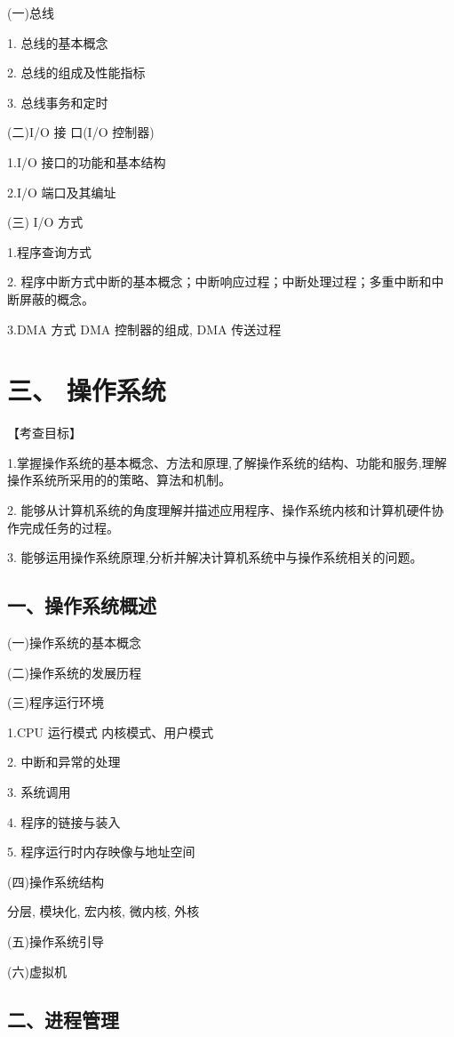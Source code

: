 \documentclass[10pt]{article}
\begin{document}
(一)总线

1. 总线的基本概念 

2. 总线的组成及性能指标 

3. 总线事务和定时 

(二)I/O 接 口(I/O 控制器) 

1.I/O 接口的功能和基本结构 

2.I/O 端口及其编址 

(三) I/O 方式 

1.程序查询方式 

2. 程序中断方式中断的基本概念；中断响应过程；中断处理过程；多重中断和中断屏蔽的概念。 

3.DMA 方式 DMA 控制器的组成, DMA 传送过程

\section*{三、 操作系统}

【考查目标】

1.掌握操作系统的基本概念、方法和原理,了解操作系统的结构、功能和服务,理解操作系统所采用的的策略、算法和机制。

2. 能够从计算机系统的角度理解并描述应用程序、操作系统内核和计算机硬件协作完成任务的过程。

3. 能够运用操作系统原理,分析并解决计算机系统中与操作系统相关的问题。

\subsection*{一、操作系统概述}

(一)操作系统的基本概念

(二)操作系统的发展历程

(三)程序运行环境

1.CPU 运行模式 内核模式、用户模式

2. 中断和异常的处理

3. 系统调用

4. 程序的链接与装入

5. 程序运行时内存映像与地址空间

(四)操作系统结构

分层, 模块化, 宏内核, 微内核, 外核

(五)操作系统引导

(六)虚拟机

\subsection*{二、进程管理}
\end{document}
